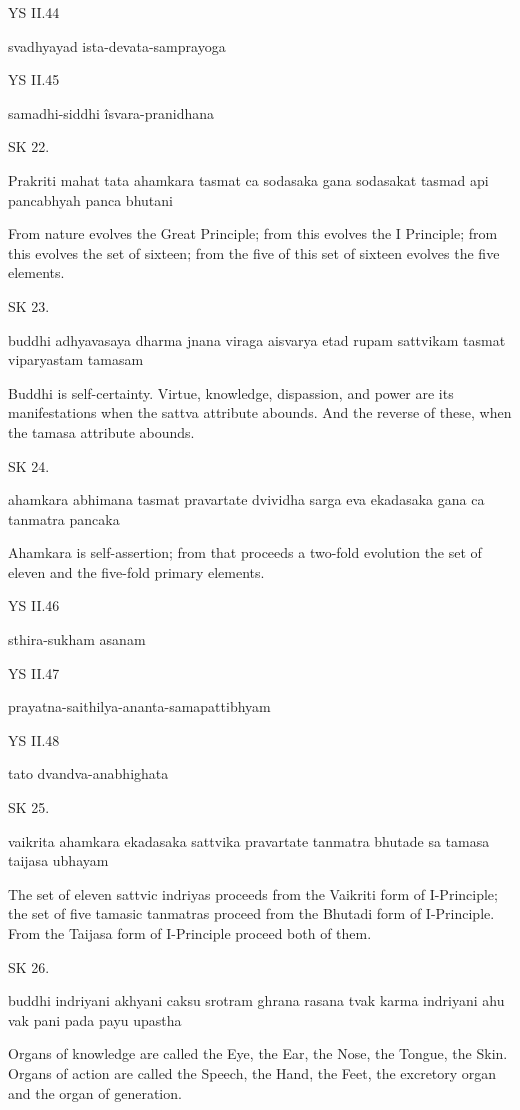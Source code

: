 YS II.44

svadhyayad ista-devata-samprayoga

YS II.45

samadhi-siddhi îsvara-pranidhana

SK 22.

Prakriti mahat tata ahamkara tasmat ca sodasaka gana
sodasakat tasmad api pancabhyah panca bhutani

From nature evolves the Great Principle;
from this evolves the I Principle;
from this evolves the set of sixteen;
from the five of this set of sixteen evolves the five elements.

SK 23.

buddhi adhyavasaya dharma jnana viraga aisvarya
etad rupam sattvikam tasmat viparyastam tamasam

Buddhi is self-certainty.
Virtue, knowledge, dispassion, and power are its manifestations
when the sattva attribute abounds.
And the reverse of these, when the tamasa attribute abounds.

SK 24.

ahamkara abhimana tasmat pravartate dvividha sarga eva
ekadasaka gana ca tanmatra pancaka

Ahamkara is self-assertion;
from that proceeds a two-fold evolution
the set of eleven and the five-fold primary elements.

YS II.46

sthira-sukham asanam

YS II.47

prayatna-saithilya-ananta-samapattibhyam

YS II.48

tato dvandva-anabhighata

SK 25.

vaikrita ahamkara ekadasaka sattvika pravartate
tanmatra bhutade sa tamasa taijasa ubhayam

The set of eleven sattvic indriyas proceeds
from the Vaikriti form of I-Principle;
the set of five tamasic tanmatras proceed
from the Bhutadi form of I-Principle.
From the Taijasa form of I-Principle proceed both of them.

SK 26.

buddhi indriyani akhyani caksu srotram ghrana rasana tvak
karma indriyani ahu vak pani pada payu upastha

Organs of knowledge are called
the Eye, the Ear, the Nose, the Tongue, the Skin.
Organs of action are called
the Speech, the Hand, the Feet, the excretory organ and the organ of generation.


